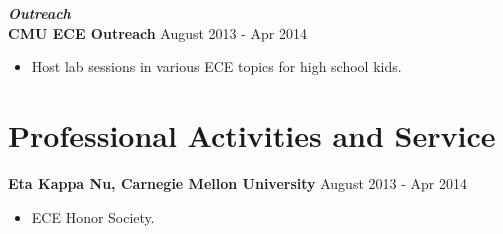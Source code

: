 \documentclass{res}
\begin{document}
\emph{\bf Outreach}
\\    {\bf CMU ECE Outreach} \hfill August 2013 - Apr 2014
    \begin{itemize}
    \item Host lab sessions in various ECE topics for high school kids.
    \end{itemize}



\section{Professional Activities and Service}
    {\bf Eta Kappa Nu, Carnegie Mellon University} \hfill August 2013 - Apr 2014
    \begin{itemize}
    \item ECE Honor Society.
    \end{itemize}
\end{document}
